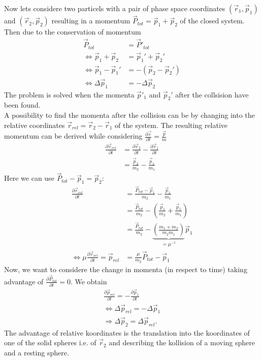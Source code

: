 \documentclass{article}
\begin{document}
    Now lets considere two particels with a pair of phase space coordinates $(\vec{r}_1, \vec{p}_1)$ and $(\vec{r}_2, \vec{p}_2)$ resulting in a momentum $\vec{P}_{tot}=\vec{p}_1+\vec{p}_2$ of the closed system. Then due to the conservation of momentum 
    \begin{align*}
        \vec{P}_{tot}&=\vec{P}'_{tot} \\
        \Leftrightarrow \vec{p}_1+\vec{p}_2&= \vec{p}_1'+\vec{p}_2' \\
        \Leftrightarrow \vec{p}_1 - \vec{p}_1' &= - (\vec{p}_2 - \vec{p}_2') \\
        \Leftrightarrow \Delta \vec{p}_1 &= -\Delta\vec{p}_2
    \end{align*}
    The problem is solved when the momenta $\vec{p}'_1$ and $\vec{p}_2'$ after the collsision have been found.\\ %

    A possibility to find the momenta after the collision can be by changing into the relative coordinates $\vec{r}_{rel}=\vec{r}_2-\vec{r}_1$ of the system. 
    The resulting relative momentum can be derived while considering $\frac{\partial \vec{r}}{\partial t}=\frac{\vec{p}}{m}$ 
    \begin{align*}
        \frac{\partial \vec{r}_{rel}}{\partial t}&= \frac{\partial \vec{r}_2}{\partial t}-\frac{\partial \vec{r}_1}{\partial t} \\
        &=\frac{\vec{p}_2}{m_2}-\frac{\vec{p}_1}{m_1} 
    \end{align*}
    Here we can use $\vec{P}_{tot}-\vec{p}_1=\vec{p}_2$:
    \begin{align*}
        \frac{\partial \vec{r}_{rel}}{\partial t} &= \frac{\vec{P}_{tot}-\vec{p}_1}{m_2} - \frac{\vec{p}_1}{m_1} \\
        &= \frac{\vec{P}_{tot}}{m_2} - \left(\frac{\vec{p}_1}{m_2}+\frac{\vec{p}_1}{m_1}\right) \\
        &= \frac{\vec{P}_{tot}}{m_2} - \underset{=\mu^{-1}}{\underbrace{\left(\frac{m_1+m_2}{m_2m_1}\right)}}  \vec{p}_1 \\
        \Leftrightarrow \mu \frac{\partial \vec{r}_{rel}}{\partial t}= \vec{p}_{rel} &= \frac{\mu}{m_2} \vec{P}_{tot} - \vec{p}_1
    \end{align*} 
    Now, we want to considere the change in momenta (in respect to time) taking advantage of $\frac{\partial \vec{P}_{tot}}{\partial t}=0$. We obtain
    \begin{align*}
        \frac{\partial \vec{p}_{rel}}{\partial t} =-\frac{\partial \vec{p}_1}{\partial t} \\
        \Leftrightarrow \Delta \vec{p}_{rel} =-\Delta \vec{p}_1 \\
        \Rightarrow \Delta \vec{p}_2 = \Delta\vec{p}_{rel}.
    \end{align*}
    The advantage of relative koordinates is the translation into the koordinates of one of the solid spheres i.e. of $\vec{r}_2$ and describing the kollision of a moving sphere and a resting sphere. \\
    
\end{document}
